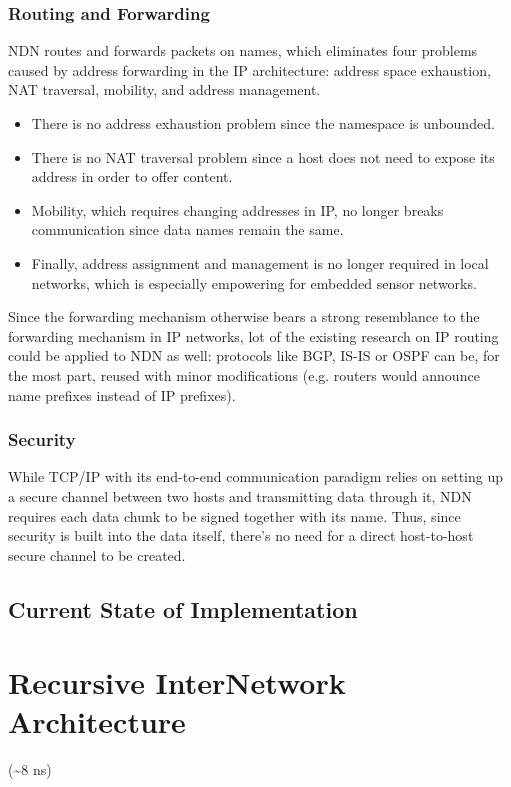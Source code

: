 		\subsection{Routing and Forwarding}
			NDN routes and forwards packets on names, which eliminates four problems caused by address forwarding in the IP architecture: address space exhaustion, NAT traversal, mobility, and address management.
			\begin{itemize}
			\item There is no address exhaustion problem since the namespace is unbounded.
			\item There is no NAT traversal problem since a host does not need to expose its address in order to offer content.
			\item Mobility, which requires changing addresses in IP, no longer breaks communication since data names remain the same.
			\item Finally, address assignment and management is no longer required in local networks, which is especially empowering for embedded sensor networks.
			\end{itemize}

			Since the forwarding mechanism otherwise bears a strong resemblance to the forwarding mechanism in IP networks, lot of the existing research on IP routing could be applied to NDN as well: protocols like BGP, IS-IS or OSPF can be, for the most part, reused with minor modifications (e.g. routers would announce name prefixes instead of IP prefixes).

		\subsection{Security}
			While TCP/IP with its end-to-end communication paradigm relies on setting up a secure channel between two hosts and transmitting data through it, NDN requires each data chunk to be signed together with its name. Thus, since security is built into the data itself, there's no need for a direct host-to-host secure channel to be created.

	\section{Current State of Implementation}

\chapter{Recursive InterNetwork Architecture}
	(\textasciitilde8 ns)
